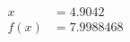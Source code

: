 \documentclass[preview]{standalone}
\begin{document}
\begin{align*}
x &= 4.9042\\f(x) &= 7.9988468
\end{align*}
\end{document}
